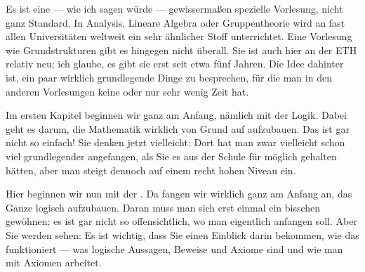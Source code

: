 \begin{spoken-clean}[00:14:10 - 00:15:56]
Es ist eine --- wie ich sagen würde --- gewissermaßen spezielle Vorlesung, nicht ganz Standard. In Analysis, Lineare Algebra oder Gruppentheorie wird an fast allen Universitäten weltweit ein sehr ähnlicher Stoff unterrichtet. Eine Vorlesung wie Grundstrukturen gibt es hingegen nicht überall. Sie ist auch hier an der ETH relativ neu; ich glaube, es gibt sie erst seit etwa fünf Jahren. Die Idee dahinter ist, ein paar wirklich grundlegende Dinge zu besprechen, für die man in den anderen Vorlesungen keine oder nur sehr wenig Zeit hat.

Im ersten Kapitel beginnen wir ganz am Anfang, nämlich mit der Logik. Dabei geht es darum, die Mathematik wirklich von Grund auf aufzubauen. Das ist gar nicht so einfach! Sie denken jetzt vielleicht:  Dort hat man zwar vielleicht schon viel grundlegender angefangen, als Sie es aus der Schule für möglich gehalten hätten, aber man steigt dennoch auf einem recht hohen Niveau ein.

Hier beginnen wir nun mit der . Da fangen wir wirklich ganz am Anfang an, das Ganze logisch aufzubauen. Daran muss man sich erst einmal ein bisschen gewöhnen; es ist gar nicht so offensichtlich, wo man eigentlich anfangen soll. Aber Sie werden sehen: Es ist wichtig, dass Sie einen Einblick darin bekommen, wie das funktioniert --- was logische Aussagen, Beweise und Axiome sind und wie man mit Axiomen arbeitet.
\end{spoken-clean}

